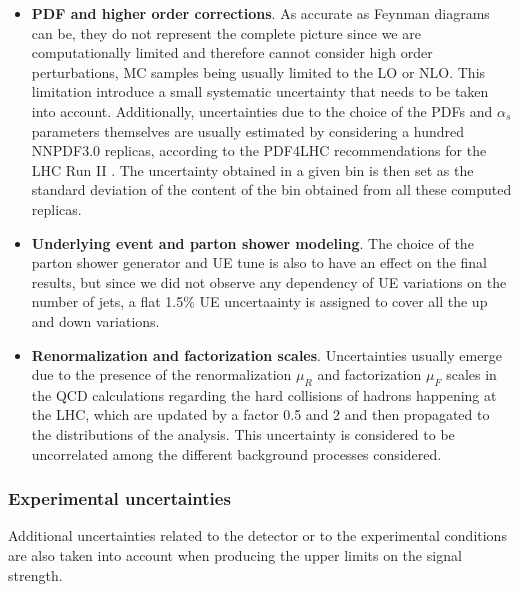 \documentclass[a4paper, 10pt, openright]{report}
\begin{document}
\begin{itemize}
\item \textbf{PDF and higher order corrections}. As accurate as Feynman diagrams can be, they do not represent the complete picture since we are computationally limited and therefore cannot consider high order perturbations, \ac{MC} samples being usually limited to the \acf{LO} or \acf{NLO}. This limitation introduce a small systematic uncertainty that needs to be taken into account. Additionally, uncertainties due to the choice of the \acp{PDF} and $\alpha_s$ parameters themselves are usually estimated by considering a hundred NNPDF3.0 \cite{NNPDF} replicas, according to the PDF4LHC recommendations for the \ac{LHC} Run II \cite{PDF4LHC}. The uncertainty obtained in a given bin is then set as the standard deviation of the content of the bin obtained from all these computed replicas.
\item \textbf{Underlying event and parton shower modeling}. The choice of the parton shower generator and \ac{UE} tune is also to have an effect on the final results, but since we did not observe any dependency of \ac{UE} variations on the number of jets, a flat 1.5\% \ac{UE} uncertaainty is assigned to cover all the up and down variations.
\item \textbf{Renormalization and factorization scales}. Uncertainties usually emerge due to the presence of the renormalization $\mu_R$ and factorization $\mu_F$ scales in the QCD calculations regarding the hard collisions of hadrons happening at the \ac{LHC}, which are updated by a factor 0.5 and 2 and then propagated to the distributions of the analysis. This uncertainty is considered to be uncorrelated among the different background processes considered.
\end{itemize}

\subsubsection{Experimental uncertainties}

Additional uncertainties related to the detector or to the experimental conditions are also taken into account when producing the upper limits on the signal strength.
\end{document}

